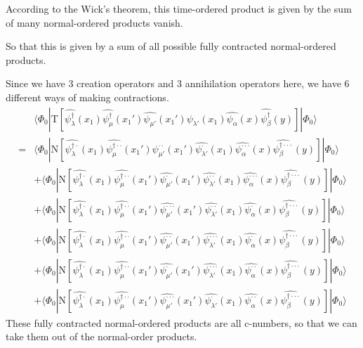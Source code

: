 According to the Wick's theorem, this time-ordered product is given by the sum of many normal-ordered products vanish.

So that this is given by a sum of all possible fully contracted normal-ordered products.

 Since we have 3 creation operators and 3 annihilation operators here, we have 6 different ways of making contractions.
\begin{align}
&\langle \Phi_0|\mathrm{T}[\hat{\psi_{\lambda}^{\dagger}}(x_1)\hat{\psi_{\mu}^{\dagger}}(x_1')\hat{\psi_{\mu'}}(x_1')\hat{\psi_{\lambda'}}(x_1)\hat{\psi_{\alpha}}(x)\hat{\psi_{\beta}^{\dagger}}(y)]|\Phi_0\rangle \nonumber \\
=&\langle\Phi_0|\mathrm{N}[\hat{\psi_{\lambda}^{\dagger\cdot}}(x_1)\hat{\psi_{\mu}^{\dagger\cdot\cdot}}(x_1')\hat{\psi_{\mu'}^{\cdot\cdot}}(x_1')\hat{\psi_{\lambda'}^{\cdot}}(x_1)\hat{\psi_{\alpha}^{\cdot\cdot\cdot}}(x)\hat{\psi_{\beta}^{\dagger\cdot\cdot\cdot}}(y)]|\Phi_0\rangle \nonumber \\
&+\langle\Phi_0|\mathrm{N}[\hat{\psi_{\lambda}^{\dagger\cdot}}(x_1)\hat{\psi_{\mu}^{\dagger\cdot\cdot}}(x_1')\hat{\psi_{\mu'}^{\cdot}}(x_1')\hat{\psi_{\lambda'}^{\cdot\cdot}}(x_1)\hat{\psi_{\alpha}^{\cdot\cdot\cdot}}(x)\hat{\psi_{\beta}^{\dagger\cdot\cdot\cdot}}(y)]|\Phi_0\rangle \nonumber \\
&+\langle\Phi_0|\mathrm{N}[\hat{\psi_{\lambda}^{\dagger\cdot}}(x_1)\hat{\psi_{\mu}^{\dagger\cdot\cdot}}(x_1')\hat{\psi_{\mu'}^{\cdot\cdot\cdot}}(x_1')\hat{\psi_{\lambda'}^{\cdot\cdot}}(x_1)\hat{\psi_{\alpha}^{\cdot}}(x)\hat{\psi_{\beta}^{\dagger\cdot\cdot\cdot}}(y)]|\Phi_0\rangle \nonumber \\
&+\langle\Phi_0|\mathrm{N}[\hat{\psi_{\lambda}^{\dagger\cdot}}(x_1)\hat{\psi_{\mu}^{\dagger\cdot\cdot}}(x_1')\hat{\psi_{\mu'}^{\cdot\cdot}}(x_1')\hat{\psi_{\lambda'}^{\cdot\cdot\cdot}}(x_1)\hat{\psi_{\alpha}^{\cdot}}(x)\hat{\psi_{\beta}^{\dagger\cdot\cdot\cdot}}(y)]|\Phi_0\rangle \nonumber \\
&+\langle\Phi_0|\mathrm{N}[\hat{\psi_{\lambda}^{\dagger\cdot}}(x_1)\hat{\psi_{\mu}^{\dagger\cdot\cdot}}(x_1')\hat{\psi_{\mu'}^{\cdot}}(x_1')\hat{\psi_{\lambda'}^{\cdot\cdot\cdot}}(x_1)\hat{\psi_{\alpha}^{\cdot\cdot}}(x)\hat{\psi_{\beta}^{\dagger\cdot\cdot\cdot}}(y)]|\Phi_0\rangle \nonumber \\
&+\langle\Phi_0|\mathrm{N}[\hat{\psi_{\lambda}^{\dagger\cdot}}(x_1)\hat{\psi_{\mu}^{\dagger\cdot\cdot}}(x_1')\hat{\psi_{\mu'}^{\cdot\cdot\cdot}}(x_1')\hat{\psi_{\lambda'}^{\cdot}}(x_1)\hat{\psi_{\alpha}^{\cdot\cdot}}(x)\hat{\psi_{\beta}^{\dagger\cdot\cdot\cdot}}(y)]|\Phi_0\rangle \nonumber
\end{align}
These fully contracted normal-ordered products are all c-numbers, so that we can take them out of  the normal-order products.

